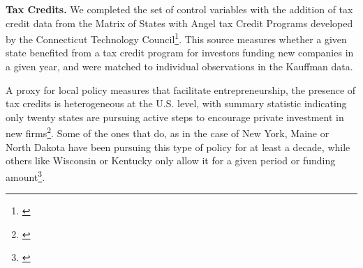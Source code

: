 \textbf{Tax Credits.} We completed the set of control variables with the addition of tax credit data from the Matrix of States with Angel tax Credit Programs developed by the Connecticut Technology Council\footnote{\cite{Nwosu2010}}. This source measures whether a given state benefited from a tax credit program for investors funding new companies in a given year, and were matched to individual observations in the Kauffman data.

A proxy for local policy measures that facilitate entrepreneurship, the presence of tax credits is heterogeneous at the U.S. level, with summary statistic indicating only twenty states are pursuing active steps to encourage private investment in new firms\footnote{\cite{Nwosu2010}}. Some of the ones that do, as in the case of New York, Maine or North Dakota have been pursuing this type of policy for at least a decade, while others like Wisconsin or Kentucky only allow it for a given period or funding amount\footnote{\cite{Nwosu2010}}. 


